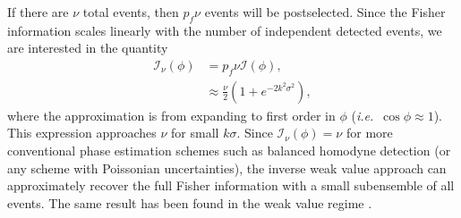 If there are $\nu$ total events, then $p_f \nu$ events will be postselected.  Since the Fisher information scales linearly with the number of independent detected events, we are interested in the quantity
\begin{align}
	\mathcal{I}_\nu (\phi) &= p_f \nu \mathcal{I}(\phi), \nonumber \\
	&\approx  \frac{\nu}{2}\left(1 + e^{-2k^2\sigma^2}\right),
\end{align} 
where the approximation is from expanding to first order in $\phi$ (\emph{i.e.}~$\cos \phi \approx 1$). This expression approaches $\nu$ for small $k\sigma$.  Since $\mathcal{I}_\nu(\phi) = \nu$ for more conventional phase estimation schemes such as balanced homodyne detection (or any scheme with Poissonian uncertainties), the inverse weak value approach can approximately recover the full Fisher information with a small subensemble of all events.  The same result has been found in the weak value regime \cite{Jordan2014}.

